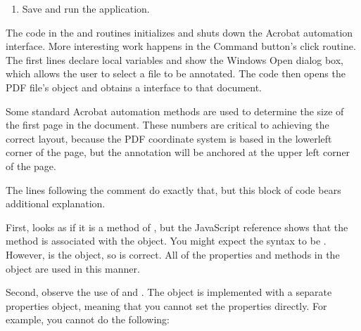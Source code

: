 \documentclass[letterpaper,12pt,english,openany,oneside]{sphinxmanual}
\begin{document}
\begin{enumerate}
%
\item {} 
Save and run the application.

\end{enumerate}

The code in the  and  routines initializes and shuts down the Acrobat automation interface. More interesting work happens in the Command button’s click routine. The first lines declare local variables and show the Windows Open dialog box, which allows the user to select a file to be annotated. The code then opens the PDF file’s  object and obtains a  interface to that document.

Some standard Acrobat automation methods are used to determine the size of the first page in the document. These numbers are critical to achieving the correct layout, because the PDF coordinate system is based in the lower\sphinxhyphen{}left corner of the page, but the annotation will be anchored at the upper left corner of the page.

The lines following the  comment do exactly that, but this block of code bears additional explanation.

First,  looks as if it is a method of , but the JavaScript reference shows that the method is associated with the  object. You might expect the syntax to be . However,  is the  object, so  is correct. All of the properties and methods in the  object are used in this manner.

Second, observe the use of  and . The  object is implemented with a separate properties object, meaning that you cannot set the properties directly. For example, you cannot do the following:

\begin{sphinxVerbatim}[commandchars=\\\{\}]
  
  
  
\end{sphinxVerbatim}
\end{document}
